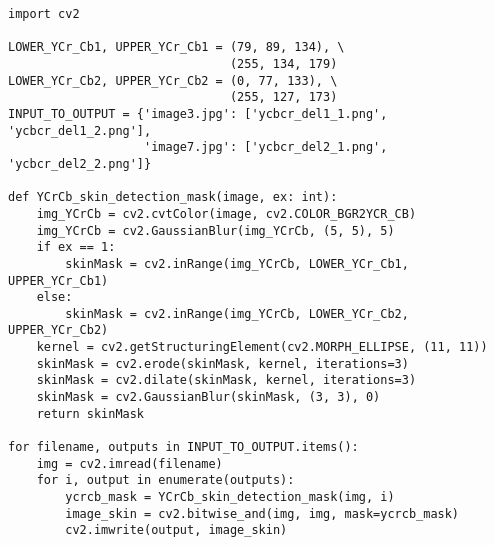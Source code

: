 \begin{verbatim}
import cv2

LOWER_YCr_Cb1, UPPER_YCr_Cb1 = (79, 89, 134), \
                               (255, 134, 179)
LOWER_YCr_Cb2, UPPER_YCr_Cb2 = (0, 77, 133), \
                               (255, 127, 173)
INPUT_TO_OUTPUT = {'image3.jpg': ['ycbcr_del1_1.png', 'ycbcr_del1_2.png'],
                   'image7.jpg': ['ycbcr_del2_1.png', 'ycbcr_del2_2.png']}

def YCrCb_skin_detection_mask(image, ex: int):
    img_YCrCb = cv2.cvtColor(image, cv2.COLOR_BGR2YCR_CB)
    img_YCrCb = cv2.GaussianBlur(img_YCrCb, (5, 5), 5)
    if ex == 1:
        skinMask = cv2.inRange(img_YCrCb, LOWER_YCr_Cb1, UPPER_YCr_Cb1)
    else:
        skinMask = cv2.inRange(img_YCrCb, LOWER_YCr_Cb2, UPPER_YCr_Cb2)
    kernel = cv2.getStructuringElement(cv2.MORPH_ELLIPSE, (11, 11))
    skinMask = cv2.erode(skinMask, kernel, iterations=3)
    skinMask = cv2.dilate(skinMask, kernel, iterations=3)
    skinMask = cv2.GaussianBlur(skinMask, (3, 3), 0)
    return skinMask

for filename, outputs in INPUT_TO_OUTPUT.items():
    img = cv2.imread(filename)
    for i, output in enumerate(outputs):
        ycrcb_mask = YCrCb_skin_detection_mask(img, i)
        image_skin = cv2.bitwise_and(img, img, mask=ycrcb_mask)
        cv2.imwrite(output, image_skin)
\end{verbatim}

